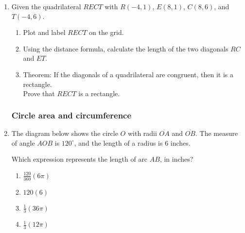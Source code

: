 \documentclass[12pt, twoside]{article}
\begin{document}
\begin{enumerate}
    \item Given the quadrilateral $RECT$ with $R(-4,1)$, $E(8,1)$, $C(8,6)$, and $T(-4,6)$.
      \begin{enumerate}
        \item Plot and label $RECT$ on the grid.
        \item Using the distance formula, calculate the length of the two diagonals $RC$ and $ET$.
        \item Theorem: If the diagonals of a quadrilateral are congruent, then it is a rectangle.\\[0.5cm]
        Prove that $RECT$ is a rectangle.
      \end{enumerate}
      \begin{center} %
      \end{center}

    \subsubsection*{Circle area and circumference}
      \item %
      The diagram below shows the circle $O$ with radii $\overline{OA}$ and $\overline{OB}$. The measure of angle $AOB$ is $120^\circ$, and the length of a radius is 6 inches.
      \begin{center}
      \end{center}
      Which expression represents the length of arc $AB$, in inches?
      \begin{multicols}{2}
        \begin{enumerate}
          \item $\displaystyle \frac{120}{360}(6\pi)$
          \item $120(6)$
          \item $\displaystyle \frac{1}{3}(36\pi)$
          \item $\displaystyle \frac{1}{3}(12\pi)$
        \end{enumerate}
    \end{multicols}


\end{enumerate}
\end{document}
